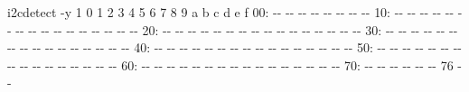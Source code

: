 \documentclass[
  11pt,
  a4paper,
  oneside, openany  ,captions=tableheading
]{scrbook}
\newenvironment{Shaded}{\begin{snugshade}}{\end{snugshade}}
\newcommand{\AttributeTok}[1]{\textcolor[rgb]{0.40,0.45,0.13}{#1}}
\newcommand{\ExtensionTok}[1]{\textcolor[rgb]{0.00,0.23,0.31}{#1}}
\newcommand{\NormalTok}[1]{\textcolor[rgb]{0.00,0.23,0.31}{#1}}
\theoremstyle{remark}
\begin{document}
\begin{Shaded}
\begin{Highlighting}[]
\ExtensionTok{i2cdetect} \AttributeTok{{-}y}\NormalTok{ 1}
     \ExtensionTok{0}\NormalTok{  1  2  3  4  5  6  7  8  9  a  b  c  d  e  f}
\ExtensionTok{00:}                         \AttributeTok{{-}{-}} \AttributeTok{{-}{-}} \AttributeTok{{-}{-}} \AttributeTok{{-}{-}} \AttributeTok{{-}{-}} \AttributeTok{{-}{-}} \AttributeTok{{-}{-}} \AttributeTok{{-}{-}} 
\ExtensionTok{10:} \AttributeTok{{-}{-}} \AttributeTok{{-}{-}} \AttributeTok{{-}{-}} \AttributeTok{{-}{-}} \AttributeTok{{-}{-}} \AttributeTok{{-}{-}} \AttributeTok{{-}{-}} \AttributeTok{{-}{-}} \AttributeTok{{-}{-}} \AttributeTok{{-}{-}} \AttributeTok{{-}{-}} \AttributeTok{{-}{-}} \AttributeTok{{-}{-}} \AttributeTok{{-}{-}} \AttributeTok{{-}{-}} \AttributeTok{{-}{-}} 
\ExtensionTok{20:} \AttributeTok{{-}{-}} \AttributeTok{{-}{-}} \AttributeTok{{-}{-}} \AttributeTok{{-}{-}} \AttributeTok{{-}{-}} \AttributeTok{{-}{-}} \AttributeTok{{-}{-}} \AttributeTok{{-}{-}} \AttributeTok{{-}{-}} \AttributeTok{{-}{-}} \AttributeTok{{-}{-}} \AttributeTok{{-}{-}} \AttributeTok{{-}{-}} \AttributeTok{{-}{-}} \AttributeTok{{-}{-}} \AttributeTok{{-}{-}} 
\ExtensionTok{30:} \AttributeTok{{-}{-}} \AttributeTok{{-}{-}} \AttributeTok{{-}{-}} \AttributeTok{{-}{-}} \AttributeTok{{-}{-}} \AttributeTok{{-}{-}} \AttributeTok{{-}{-}} \AttributeTok{{-}{-}} \AttributeTok{{-}{-}} \AttributeTok{{-}{-}} \AttributeTok{{-}{-}} \AttributeTok{{-}{-}} \AttributeTok{{-}{-}} \AttributeTok{{-}{-}} \AttributeTok{{-}{-}} \AttributeTok{{-}{-}} 
\ExtensionTok{40:} \AttributeTok{{-}{-}} \AttributeTok{{-}{-}} \AttributeTok{{-}{-}} \AttributeTok{{-}{-}} \AttributeTok{{-}{-}} \AttributeTok{{-}{-}} \AttributeTok{{-}{-}} \AttributeTok{{-}{-}} \AttributeTok{{-}{-}} \AttributeTok{{-}{-}} \AttributeTok{{-}{-}} \AttributeTok{{-}{-}} \AttributeTok{{-}{-}} \AttributeTok{{-}{-}} \AttributeTok{{-}{-}} \AttributeTok{{-}{-}} 
\ExtensionTok{50:} \AttributeTok{{-}{-}} \AttributeTok{{-}{-}} \AttributeTok{{-}{-}} \AttributeTok{{-}{-}} \AttributeTok{{-}{-}} \AttributeTok{{-}{-}} \AttributeTok{{-}{-}} \AttributeTok{{-}{-}} \AttributeTok{{-}{-}} \AttributeTok{{-}{-}} \AttributeTok{{-}{-}} \AttributeTok{{-}{-}} \AttributeTok{{-}{-}} \AttributeTok{{-}{-}} \AttributeTok{{-}{-}} \AttributeTok{{-}{-}} 
\ExtensionTok{60:} \AttributeTok{{-}{-}} \AttributeTok{{-}{-}} \AttributeTok{{-}{-}} \AttributeTok{{-}{-}} \AttributeTok{{-}{-}} \AttributeTok{{-}{-}} \AttributeTok{{-}{-}} \AttributeTok{{-}{-}} \AttributeTok{{-}{-}} \AttributeTok{{-}{-}} \AttributeTok{{-}{-}} \AttributeTok{{-}{-}} \AttributeTok{{-}{-}} \AttributeTok{{-}{-}} \AttributeTok{{-}{-}} \AttributeTok{{-}{-}} 
\ExtensionTok{70:} \AttributeTok{{-}{-}} \AttributeTok{{-}{-}} \AttributeTok{{-}{-}} \AttributeTok{{-}{-}} \AttributeTok{{-}{-}} \AttributeTok{{-}{-}}\NormalTok{ 76 }\AttributeTok{{-}{-}}  
\end{Highlighting}
\end{Shaded}
\end{document}
